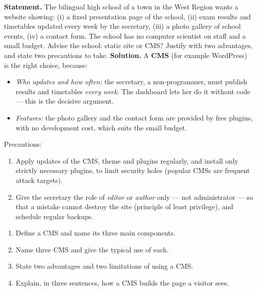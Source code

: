\documentclass[11pt]{article}
\begin{document}
\begin{exoresolu}
\textbf{Statement.} The bilingual high school of a town in the West Region wants a website showing: (i) a fixed presentation page of the school, (ii) exam results and timetables updated every week by the secretary, (iii) a photo gallery of school events, (iv) a contact form. The school has no computer scientist on staff and a small budget. Advise the school: static site or CMS? Justify with two advantages, and state two precautions to take.
\tcblower
\textbf{Solution.} A \textbf{CMS} (for example WordPress) is the right choice, because:
\begin{itemize}
\item \emph{Who updates and how often:} the secretary, a non-programmer, must publish results and timetables \emph{every week}. The dashboard lets her do it without code --- this is the decisive argument.
\item \emph{Features:} the photo gallery and the contact form are provided by free plugins, with no development cost, which suits the small budget.
\end{itemize}
Precautions:
\begin{enumerate}
\item Apply updates of the CMS, theme and plugins regularly, and install only strictly necessary plugins, to limit security holes (popular CMSs are frequent attack targets).
\item Give the secretary the role of \emph{editor} or \emph{author} only --- not administrator --- so that a mistake cannot destroy the site (principle of least privilege), and schedule regular backups.
\end{enumerate}
\end{exoresolu}

\begin{exercice}
\begin{enumerate}
\item Define a CMS and name its three main components.
\item Name three CMS and give the typical use of each.
\item State two advantages and two limitations of using a CMS.
\item Explain, in three sentences, how a CMS builds the page a visitor sees.
\end{enumerate}
\end{exercice}
\end{document}
